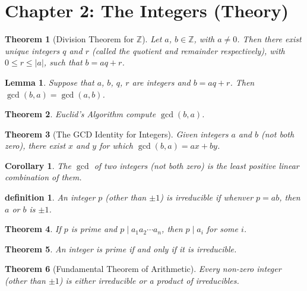 \documentclass[8pt]{article}
\newtheorem{theorem}{Theorem}
\newtheorem{lemma}{Lemma}
\newtheorem{corollary}{Corollary}
\newtheorem{definition}{definition}
\begin{document}
\section{Chapter 2: The Integers (Theory)}

\begin{theorem}[Division Theorem for $\mathbb{Z}$]
    Let $a$, $b \in \mathbb{Z}$, with $a \not = 0$.
    Then there exist unique integers $q$ and $r$ (called the 
    quotient and remainder respectively), with $0 \le r \le |a|$,
    such that $b = aq + r$.
\end{theorem}

\begin{lemma}
    Suppose that $a$, $b$, $q$, $r$ are integers and $b = aq + r$.
    Then $\gcd(b, a) = \gcd(a, b)$.
\end{lemma}

\begin{theorem}
    Euclid's Algorithm compute $\gcd(b, a)$.
\end{theorem}

\begin{theorem}[The GCD Identity for Integers]
    Given integers $a$ and $b$ (not both zero), there exist $x$
    and $y$ for which $\gcd(b, a) = ax + by$.
\end{theorem}

\begin{corollary}
    The $\gcd$ of two integers (not both zero) is the least positive 
    linear combination of them.
\end{corollary}

\begin{definition}
    An integer $p$ (other than $\pm 1$) is irreducible if whenver 
    $p = ab$, then $a$ or $b$ is $\pm 1$.
\end{definition}

\begin{theorem}
    If $p$ is prime and $p \mid a_1 a_2 \cdots a_n$, then $p \mid a_i$
    for some $i$.
\end{theorem}

\begin{theorem}
    An integer is prime if and only if it is irreducible.
\end{theorem}

\begin{theorem} [Fundamental Theorem of Arithmetic]
    Every non-zero integer (other than $\pm 1$) is either irreducible 
    or a product of irreducibles.
\end{theorem}
\end{document}
